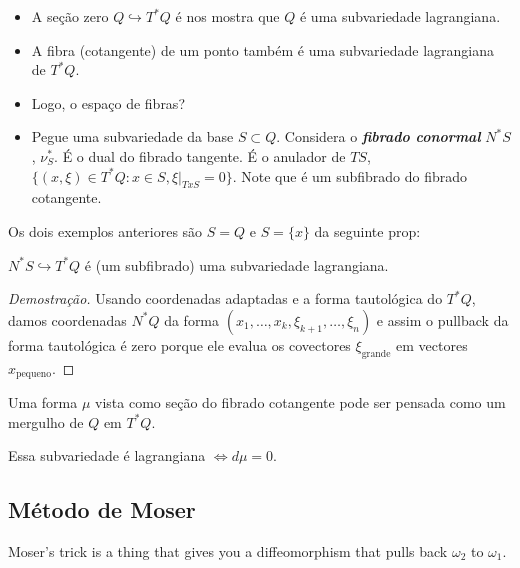 \begin{example}\leavevmode 
	\begin{itemize}
		\item A se\c c\~ao zero $Q\hookrightarrow T^*Q$ \'e nos mostra que $Q$ \'e uma subvariedade lagrangiana.

		\item A fibra (cotangente) de um ponto tamb\'em \'e uma subvariedade lagrangiana de $T^*Q$.

		\item Logo, o espaço de fibras?

		\item Pegue uma subvariedade da base $S\subset Q$. Considera o \textit{\textbf{fibrado conormal}} $N^*S$, $\nu_S^*$. \'E o dual do fibrado tangente. \'E o anulador de $TS$,  $\{(x,\xi)\in T^*Q:x\in S, \xi|_{TxS}=0\}$. Note que \'e um subfibrado do fibrado cotangente.
	\end{itemize}
\end{example}

Os dois exemplos anteriores s\~ao $S=Q$ e  $S=\{x\}$ da seguinte prop:

\begin{prop}
	$N^*S\hookrightarrow T^*Q$ \'e (um subfibrado) uma subvariedade lagrangiana.
\end{prop}

\begin{proof}[Demostra\c c\~ao]
	Usando coordenadas adaptadas e a forma tautol\'ogica do $T^*Q$, damos coordenadas $N^*Q$ da forma $(x_1,\ldots,x_k,\xi_{k+1},\ldots,\xi_n)$ e assim o pullback da forma tautol\'ogica \'e zero porque ele evalua os covectores $\xi_{\text{grande} }$ em vectores $x_{\text{pequeno} }$.
\end{proof}

\begin{example}
	Uma forma $\mu$ vista como se\c c\~ao do fibrado cotangente pode ser pensada como um mergulho de $Q$ em $T^*Q$.
\end{example}

\begin{prop}
	Essa subvariedade \'e lagrangiana $\iff d\mu=0$.
\end{prop}

\subsection{M\'etodo de Moser}

\begin{upshot}
	Moser's trick is a thing that gives you a diffeomorphism that pulls back $\omega_2$ to $\omega_1$.
\end{upshot}

